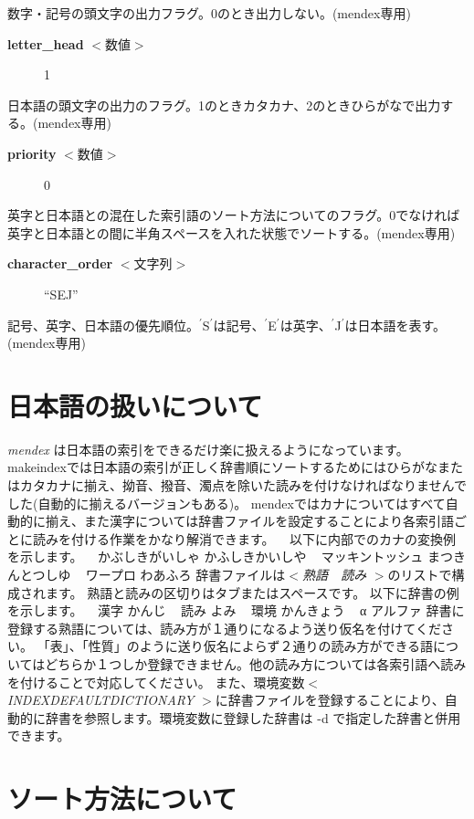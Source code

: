 \documentclass[10pt,dvipdfmx]{jsarticle}
\begin{document}
 数字・記号の頭文字の出力フラグ。0のとき出力しない。(mendex専用)\begin{description}
\item[\textbf{letter\_head}
 $<$数値$>$] 1

\end{description}
 日本語の頭文字の出力のフラグ。1のときカタカナ、2のときひらがなで出力する。(mendex専用)\begin{description}
\item[\textbf{priority}
 $<$数値$>$] 0

\end{description}
 英字と日本語との混在した索引語のソート方法についてのフラグ。0でなければ英字と日本語との間に半角スペースを入れた状態でソートする。(mendex専用)\begin{description}
\item[\textbf{character\_order}
 $<$文字列$>$] ``SEJ''

\end{description}
 記号、英字、日本語の優先順位。$^\prime$S$^\prime$は記号、$^\prime$E$^\prime$は英字、$^\prime$J$^\prime$は日本語を表す。(mendex専用)\section*{日本語の扱いについて}
\emph{mendex}
 は日本語の索引をできるだけ楽に扱えるようになっています。 makeindexでは日本語の索引が正しく辞書順にソートするためにはひらがなまたはカタカナに揃え、拗音、撥音、濁点を除いた読みを付けなければなりませんでした(自動的に揃えるバージョンもある)。 mendexではカナについてはすべて自動的に揃え、また漢字については辞書ファイルを設定することにより各索引語ごとに読みを付ける作業をかなり解消できます。   以下に内部でのカナの変換例を示します。   かぶしきがいしゃ かふしきかいしや   マッキントッシュ まつきんとつしゆ   ワープロ わあふろ 辞書ファイルは$<$\emph{熟語  読み}
$>$のリストで構成されます。 熟語と読みの区切りはタブまたはスペースです。 以下に辞書の例を示します。   漢字 かんじ   読み よみ   環境 かんきょう   α アルファ 辞書に登録する熟語については、読み方が１通りになるよう送り仮名を付けてください。 「表」、「性質」のように送り仮名によらず２通りの読み方ができる語についてはどちらか１つしか登録できません。他の読み方については各索引語へ読みを付けることで対応してください。 また、環境変数$<$ \emph{INDEXDEFAULTDICTIONARY}
$>$に辞書ファイルを登録することにより、自動的に辞書を参照します。環境変数に登録した辞書は -d で指定した辞書と併用できます。\section*{ソート方法について}
\end{document}
